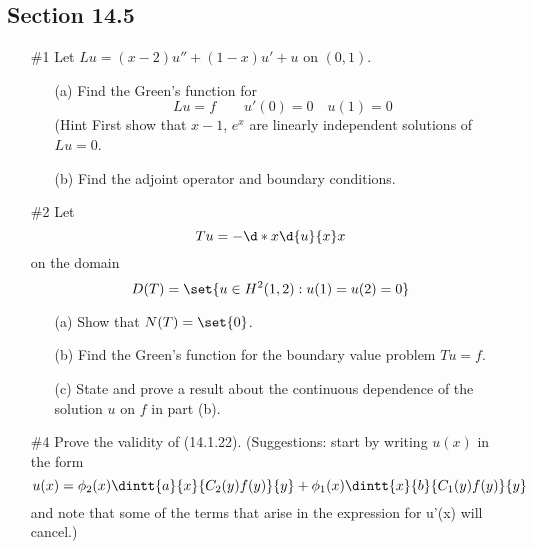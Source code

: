 \documentclass[11pt, oneside]{article}
\begin{document}
\subsection*{Section 14.5}
\begin{enumerate}
  \item[\#1]
    Let $Lu = (x - 2)u'' + (1 - x)u' + u$ on $(0, 1)$.
    \begin{enumerate}
      \item[(a)]
        Find the Green's function for
        \[
          Lu = f \qquad u'(0) = 0 \quad u(1) = 0
        \]
        (Hint First show that $x - 1$, $e^x$ are linearly independent
        solutions of $Lu = 0$.

      \item[(b)]
        Find the adjoint operator and boundary conditions.
    \end{enumerate}

  \pagebreak
  \item[\#2]
    Let
    \[
      Tu = - \d*{x \d{u}{x}}{x}
    \]
    on the domain
    \[
      D(T) = \set{u \in H^2(1, 2): u(1) = u(2) = 0}
    \]
    \begin{enumerate}
      \item[(a)]
        Show that $N(T) = \set{0}$.
      \item[(b)]
        Find the Green's function for the boundary value problem $Tu = f$.
      \item[(c)]
        State and prove a result about the continuous dependence of the
        solution $u$ on $f$ in part (b).
    \end{enumerate}

  \pagebreak
  \item[\#4]
    Prove the validity of (14.1.22).
    (Suggestions: start by writing $u(x)$ in the form
    \[
      u(x) = \phi_2(x) \dintt{a}{x}{C_2(y)f(y)}{y} + \phi_1(x) \dintt{x}{b}{C_1(y)f(y)}{y}
    \]
    and note that some of the terms that arise in the expression for u'(x) will
    cancel.)
\end{enumerate}
\end{document}
